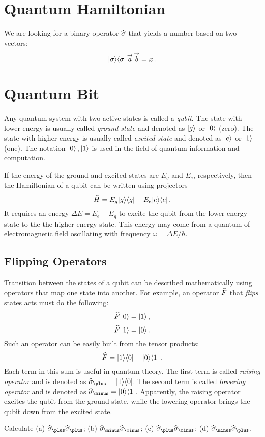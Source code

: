 \section{Quantum Hamiltonian}\label{sec:QuantumHamiltonian}
We are looking for a binary operator $\widehat{\sigma}$ that yields a number
based on two vectors:
\[
|{\sigma}\rangle\langle{\sigma}|\,\overset{\rightarrow}{a}\,\overset{\rightarrow}{b}=x\,.
\]


\section{Quantum Bit}\label{sec:Qubit}
Any quantum system with two active states is called a \emph{qubit}. The state with lower energy is usually called \emph{ground state} and denoted as $|{g}\rangle$ or $|{0}\rangle$ (zero). The state with higher energy is usually called \emph{excited state} and denoted as $|{e}\rangle$ or $|{1}\rangle$ (one). The notation $|{0}\rangle\,,|{1}\rangle$ is used in the field of quantum information and computation.

If the energy of the ground and excited states are $E_g$ and $E_e$, respectively, then the Hamiltonian of a qubit can be written using projectors
\[
\widehat{H} = E_g|{g}\rangle\langle{g}|+E_e|{e}\rangle\langle{e}|\,.
\]
It requires an energy $\Delta E=E_e-E_g$ to excite the qubit from the lower energy state to the the higher energy state. This energy may come from a quantum of electromagnetic field oscillating with frequency $\omega=\Delta E/\hbar$.

\subsection{Flipping Operators}
Transition between the states of a qubit can be described mathematically using operators that map one state into another. For example, an operator $\widehat{F}$ that \emph{flips} states acts must do the following:
\[
\widehat{F}\,|{0}\rangle=|{1}\rangle\,,
\]
\[
\widehat{F}\,|{1}\rangle=|{0}\rangle\,.
\]
Such an operator can be easily built from the tensor products:
\[
\widehat{F} = |{1}\rangle\langle{0}|+|{0}\rangle\langle{1}|\,.
\]
Each term in this sum is useful in quantum theory. The first term is called \emph{raising operator} and is denoted as 
$ \op{\sigma}_\plus=\ketbra{1}{0}$. The second term is called \emph{lowering operator} and is denoted as $ \op{\sigma}_\minus=\ketbra{0}{1}$. Apparently, the raising operator excites the qubit from the ground state, while the lowering operator brings the qubit down from the excited state.

\begin{exercise}
	Calculate (a) $\op{\sigma}_\plus \op{\sigma}_\plus$; (b) $\op{\sigma}_\minus \op{\sigma}_\minus$; (c) $\op{\sigma}_\plus \op{\sigma}_\minus$; (d) $\op{\sigma}_\minus \op{\sigma}_\plus$.
\end{exercise}

